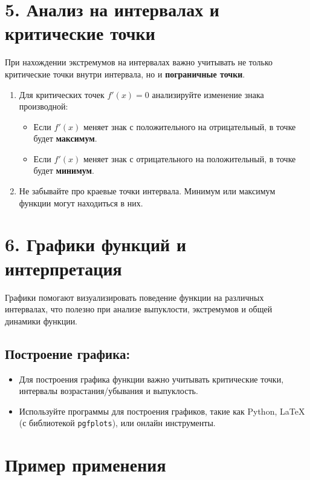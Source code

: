 \documentclass[a4paper,12pt]{article}
\begin{document}
\section*{5. Анализ на интервалах и критические точки}

При нахождении экстремумов на интервалах важно учитывать не только критические точки внутри интервала, но и \textbf{пограничные точки}.

\begin{enumerate}
    \item Для критических точек \( f'(x) = 0 \) анализируйте изменение знака производной:
    \begin{itemize}
        \item Если \( f'(x) \) меняет знак с положительного на отрицательный, в точке будет \textbf{максимум}.
        \item Если \( f'(x) \) меняет знак с отрицательного на положительный, в точке будет \textbf{минимум}.
    \end{itemize}
    \item Не забывайте про краевые точки интервала. Минимум или максимум функции могут находиться в них.
\end{enumerate}

\section*{6. Графики функций и интерпретация}

Графики помогают визуализировать поведение функции на различных интервалах, что полезно при анализе выпуклости, экстремумов и общей динамики функции.

\subsection*{Построение графика:}
\begin{itemize}
    \item Для построения графика функции важно учитывать критические точки, интервалы возрастания/убывания и выпуклость.
    \item Используйте программы для построения графиков, такие как Python, LaTeX (с библиотекой \texttt{pgfplots}), или онлайн инструменты.
\end{itemize}

\section*{Пример применения}
\end{document}
